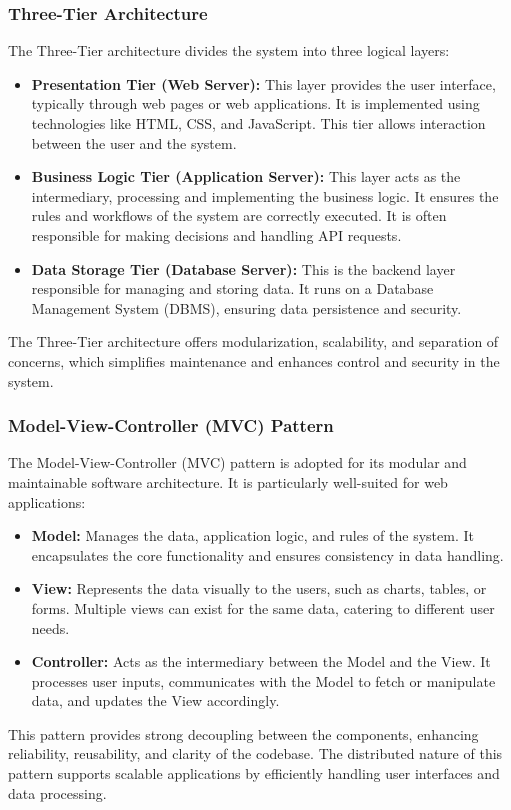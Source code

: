 \subsubsection{Three-Tier Architecture}
The Three-Tier architecture divides the system into three logical layers: 
\begin{itemize}
    \item \textbf{Presentation Tier (Web Server):} This layer provides the user interface, typically through web pages or web applications. It is implemented using technologies like HTML, CSS, and JavaScript. This tier allows interaction between the user and the system.
    \item \textbf{Business Logic Tier (Application Server):} This layer acts as the intermediary, processing and implementing the business logic. It ensures the rules and workflows of the system are correctly executed. It is often responsible for making decisions and handling API requests.
    \item \textbf{Data Storage Tier (Database Server):} This is the backend layer responsible for managing and storing data. It runs on a Database Management System (DBMS), ensuring data persistence and security.
\end{itemize}
The Three-Tier architecture offers modularization, scalability, and separation of concerns, which simplifies maintenance and enhances control and security in the system.

\subsubsection{Model-View-Controller (MVC) Pattern}
The Model-View-Controller (MVC) pattern is adopted for its modular and maintainable software architecture. It is particularly well-suited for web applications:
\begin{itemize}
    \item \textbf{Model:} Manages the data, application logic, and rules of the system. It encapsulates the core functionality and ensures consistency in data handling.
    \item \textbf{View:} Represents the data visually to the users, such as charts, tables, or forms. Multiple views can exist for the same data, catering to different user needs.
    \item \textbf{Controller:} Acts as the intermediary between the Model and the View. It processes user inputs, communicates with the Model to fetch or manipulate data, and updates the View accordingly.
\end{itemize}
This pattern provides strong decoupling between the components, enhancing reliability, reusability, and clarity of the codebase. The distributed nature of this pattern supports scalable applications by efficiently handling user interfaces and data processing.


